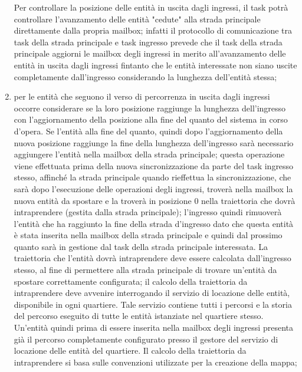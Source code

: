 \begin{enumerate}
Per controllare la posizione delle entità in uscita dagli ingressi, il task potrà controllare l'avanzamento delle entità "cedute" alla strada principale direttamente dalla propria mailbox; infatti il protocollo di comunicazione tra task della strada principale e task ingresso prevede che il task della strada principale aggiorni le mailbox degli ingressi in merito all'avanzamento delle entità in uscita dagli ingressi fintanto che le entità interessate non siano uscite completamente dall'ingresso considerando la lunghezza dell'entità stessa;
\item per le entità che seguono il verso di percorrenza in uscita dagli ingressi
occorre considerare se la loro posizione raggiunge la lunghezza dell'ingresso con l'aggiornamento della posizione alla fine del quanto del sistema in corso d'opera. Se l'entità alla fine del quanto, quindi dopo l'aggiornamento della nuova posizione raggiunge la fine della lunghezza dell'ingresso sarà necessario aggiungere l'entità nella mailbox della strada principale; questa operazione viene effettuata prima della nuova sincronizzazione da parte del task ingresso stesso, affinché la strada principale quando rieffettua la sincronizzazione, che sarà dopo l'esecuzione delle operazioni degli ingressi, troverà nella mailbox la nuova entità da spostare e la troverà in posizione 0 nella traiettoria che dovrà intraprendere (gestita dalla strada principale); l'ingresso quindi rimuoverà l'entità che ha raggiunto la fine della strada d'ingresso dato che questa entità è stata inserita nella mailbox della strada principale e quindi dal prossimo quanto sarà in gestione dal task della strada principale interessata. La traiettoria che l'entità dovrà intraprendere deve essere calcolata dall'ingresso stesso, al fine di permettere alla strada principale di trovare un'entità da spostare correttamente configurata; il calcolo della traiettoria da intraprendere deve avvenire interrogando il servizio di locazione delle entità, disponibile in ogni quartiere. Tale servizio contiene tutti i percorsi e la storia del percorso eseguito di tutte le entità istanziate nel quartiere stesso. Un'entità quindi prima di essere inserita nella mailbox degli ingressi presenta già il percorso completamente configurato presso il gestore del servizio di locazione delle entità del quartiere. Il calcolo della traiettoria da intraprendere si basa sulle convenzioni utilizzate per la creazione della mappa;

\end{enumerate}
